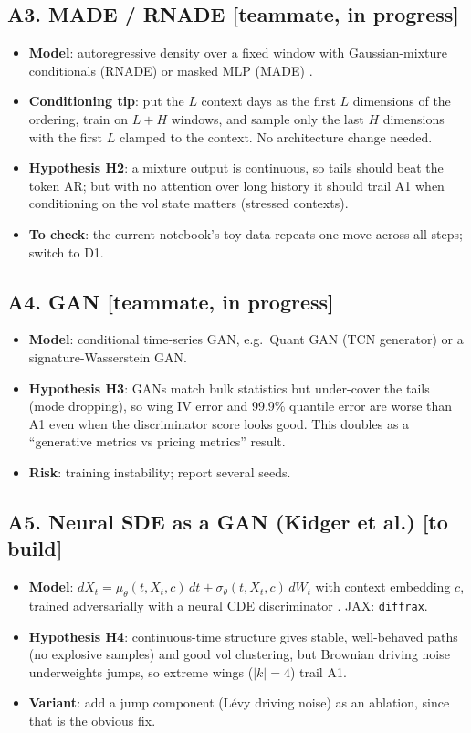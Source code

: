 \documentclass[10pt]{article}
\newcommand{\status}[1]{\textsf{\small[#1]}}
\begin{document}
\subsection{A3. MADE / RNADE \status{teammate, in progress}}
\begin{itemize}
\item \textbf{Model}: autoregressive density over a fixed window with Gaussian-mixture conditionals (RNADE) or
masked MLP (MADE) \cite{made,rnade}.
\item \textbf{Conditioning tip}: put the $L$ context days as the first $L$ dimensions of the ordering, train on
$L+H$ windows, and sample only the last $H$ dimensions with the first $L$ clamped to the context. No architecture
change needed.
\item \textbf{Hypothesis H2}: a mixture output is continuous, so tails should beat the token AR; but with no
attention over long history it should trail A1 when conditioning on the vol state matters (stressed contexts).
\item \textbf{To check}: the current notebook's toy data repeats one move across all steps; switch to D1.
\end{itemize}

\subsection{A4. GAN \status{teammate, in progress}}
\begin{itemize}
\item \textbf{Model}: conditional time-series GAN, e.g.\ Quant GAN (TCN generator) \cite{quantgan} or a
signature-Wasserstein GAN.
\item \textbf{Hypothesis H3}: GANs match bulk statistics but under-cover the tails (mode dropping), so wing IV
error and 99.9\% quantile error are worse than A1 even when the discriminator score looks good. This doubles as a
``generative metrics vs pricing metrics'' result.
\item \textbf{Risk}: training instability; report several seeds.
\end{itemize}

\subsection{A5. Neural SDE as a GAN (Kidger et al.) \status{to build}}
\begin{itemize}
\item \textbf{Model}: $dX_t=\mu_\theta(t,X_t,c)\,dt+\sigma_\theta(t,X_t,c)\,dW_t$ with context embedding $c$,
trained adversarially with a neural CDE discriminator \cite{kidger}. JAX: \texttt{diffrax}.
\item \textbf{Hypothesis H4}: continuous-time structure gives stable, well-behaved paths (no explosive samples) and
good vol clustering, but Brownian driving noise underweights jumps, so extreme wings ($|k|=4$) trail A1.
\item \textbf{Variant}: add a jump component (L\'evy driving noise) as an ablation, since that is the obvious fix.
\end{itemize}
\end{document}

